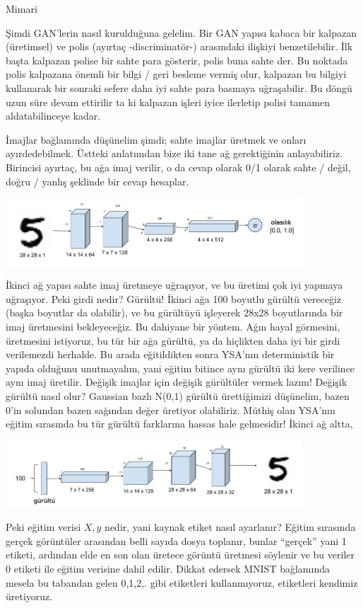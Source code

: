 \documentclass[12pt,fleqn]{article}\usepackage{../../common}
\begin{document}
Mimari

Şimdi GAN'lerin nasıl kurulduğuna gelelim. Bir GAN yapısı kabaca bir kalpazan
(üretimsel) ve polis (ayırtaç -discriminatör-) arasındaki ilişkiyi
benzetilebilir. İlk başta kalpazan polise bir sahte para gösterir, polis buna
sahte der. Bu noktada polis kalpazana önemli bir bilgi / geri besleme vermiş
olur, kalpazan bu bilgiyi kullanarak bir sonraki sefere daha iyi sahte para
basmaya uğraşabilir. Bu döngü uzun süre devam ettirilir ta ki kalpazan işleri
iyice ilerletip polisi tamamen aldatabilinceye kadar. 

İmajlar bağlamında düşünelim şimdi; sahte imajlar üretmek ve onları
ayırdedebilmek. Üstteki anlatımdan bize iki tane ağ gerektiğinin
anlayabiliriz. Birincisi ayırtaç, bu ağa imaj verilir, o da cevap olarak 0/1
olarak sahte / değil, doğru / yanlış şeklinde bir cevap hesaplar. 

\includegraphics[width=30em]{gan_05.png}

İkinci ağ yapısı sahte imaj üretmeye uğraşıyor, ve bu üretimi çok iyi yapmaya
uğraşıyor. Peki girdi nedir? Gürültü! İkinci ağa 100 boyutlu gürültü vereceğiz
(başka boyutlar da olabilir), ve bu gürültüyü işleyerek 28x28 boyutlarında bir
imaj üretmesini bekleyeceğiz. Bu dahiyane bir yöntem. Ağın hayal görmesini,
üretmesini istiyoruz, bu tür bir ağa gürültü, ya da hiçlikten daha iyi bir girdi
verilemezdi herhalde. Bu arada eğitildikten sonra YSA'nın deterministik bir
yapıda olduğunu unutmayalım, yani eğitim bitince aynı gürültü iki kere verilince
aynı imaj üretilir. Değişik imajlar için değişik gürültüler vermek lazım!
Değişik gürültü nasıl olur? Gaussian bazlı N(0,1) gürültü ürettiğimizi
düşünelim, bazen 0'in solundan bazen sağından değer üretiyor olabiliriz. Müthiş
olan YSA'nın eğitim sırasında bu tür gürültü farklarına hassas hale
gelmesidir! İkinci ağ altta,

\includegraphics[width=30em]{gan_06.png}

Peki eğitim verisi $X,y$ nedir, yani kaynak etiket nasıl ayarlanır? Eğitim
sırasında gerçek görüntüler arasından belli sayıda dosya toplanır, bunlar
``gerçek'' yani 1 etiketi, ardından elde en son olan üretece görüntü üretmesi
söylenir ve bu veriler 0 etiketi ile eğitim verisine dahil edilir. Dikkat
edersek MNIST bağlamında mesela bu tabandan gelen 0,1,2,. gibi etiketleri
kullanmıyoruz, etiketleri kendimiz üretiyoruz. 
\end{document}
